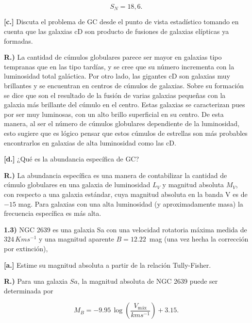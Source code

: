 \documentclass[paper=a4, fontsize=10pt]{scrartcl} %
\begin{document}
\begin{equation} \label{eq:1.14}
S_N = 18,6. 
\end{equation}



{\bf{[c.]}} Discuta el problema de GC desde el punto de vista estadístico tomando en cuenta que las galaxias cD son producto de fusiones de galaxias elípticas ya formadas.

{\bf{R.)}} La cantidad de cúmulos globulares parece ser mayor en galaxias tipo tempranas que en las tipo tardías, y se cree que su número incrementa con la luminosidad total galáctica. Por otro lado, las gigantes cD son galaxias muy brillantes y se encuentran en centros de cúmulos de galaxias. Sobre su formación se dice que son el resultado de la fusión de varias galaxias pequeñas con la galaxia más brillante del cúmulo en el centro. Estas galaxias se caracterizan pues por ser muy luminosas, con un alto brillo superficial en su centro. De esta manera, al ser el número de cúmulos globulares dependiente de la luminosidad, esto sugiere que es lógico pensar que estos cúmulos de estrellas son más probables encontrarlos en galaxias de alta luminosidad como las cD. 

\vspace{0.3cm} 

{\bf{[d.]}} ¿Qué es la abundancia específica de GC? 


{\bf{R.)}} La abundancia específica es una manera de contabilizar la cantidad de cúmulo globulares en una galaxia de luminosidad $L_V$ y magnitud absoluta $M_V$, con respecto a una galaxia estándar, cuya magnitud absoluta en la banda V es de $- 15$ mag. Para galaxias con una alta luminosidad (y aproximadamente masa) la frecuencia específica es más alta. 


 
\vspace{0.5cm}

{\bf{1.3)}} NGC 2639 es una galaxia Sa con una velocidad rotatoria máxima medida de $324 \, Km s^{-1}$
y una magnitud aparente $B = 12.22 \,$  mag (una vez hecha la corrección por extinción),

\vspace{0.3cm} 

{\bf{[a.]}} Estime su magnitud absoluta a partir de la relación Tully-Fisher.

{\bf{R.)}} Para una galaxia $Sa$, la magnitud absoluta de NGC 2639 puede ser determinada por 

\begin{equation} \label{eq:1.15}
M_B = -9.95 \, \log \left(\frac{V_{\text{máx}}}{kms^{-1}} \right) + 3.15.
\end{equation}
\end{document}
